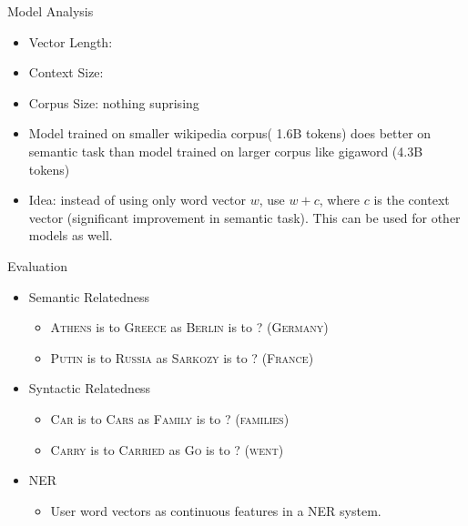
\begin{frame}{Model Analysis}
  \begin{itemize}
  \item Vector Length:
  \item Context Size: 
  \item Corpus Size: nothing suprising
  \item Model trained on smaller wikipedia corpus( 1.6B tokens) does better on semantic task than model trained on larger corpus like gigaword (4.3B tokens)
  \item Idea: instead of using only word vector $w$, use $w+c$, where $c$ is the context vector (significant improvement in semantic task). This can be used for other models as well.
  \end{itemize}
\end{frame}

\begin{frame}{Evaluation}
  \begin{itemize}[<+->]
  \item Semantic Relatedness %
    \begin{itemize}
    \item \textsc{Athens} is to \textsc{Greece} as \textsc{Berlin} is to ? (\textsc{Germany})
    \item \textsc{Putin} is to \textsc{Russia} as \textsc{Sarkozy} is to ? (\textsc{France})
    \end{itemize}
  \item Syntactic Relatedness %
    \begin{itemize}
    \item \textsc{Car} is to \textsc{Cars} as \textsc{Family} is to ? (\textsc{families})
    \item \textsc{Carry} is to \textsc{Carried} as \textsc{Go} is to ? (\textsc{went})
    \end{itemize}
  \item NER 
    \begin{itemize}
    \item User word vectors as continuous features in a NER system.
    \end{itemize}
  \end{itemize}
\end{frame}

